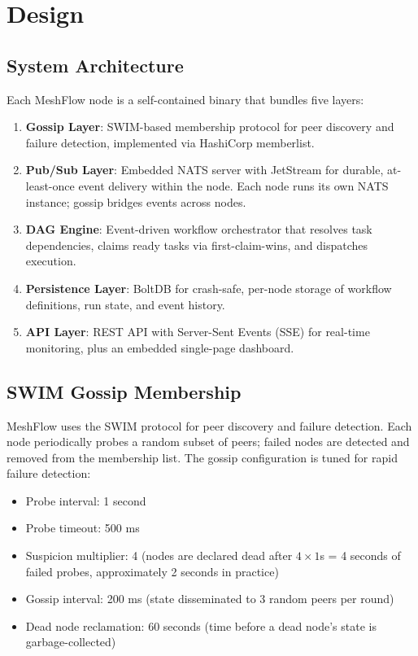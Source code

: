 \section{Design}

\subsection{System Architecture}

Each MeshFlow node is a self-contained binary that bundles five layers:

\begin{enumerate}
\item \textbf{Gossip Layer}: SWIM-based membership protocol for peer discovery and failure detection, implemented via HashiCorp memberlist.
\item \textbf{Pub/Sub Layer}: Embedded NATS server with JetStream for durable, at-least-once event delivery within the node. Each node runs its own NATS instance; gossip bridges events across nodes.
\item \textbf{DAG Engine}: Event-driven workflow orchestrator that resolves task dependencies, claims ready tasks via first-claim-wins, and dispatches execution.
\item \textbf{Persistence Layer}: BoltDB for crash-safe, per-node storage of workflow definitions, run state, and event history.
\item \textbf{API Layer}: REST API with Server-Sent Events (SSE) for real-time monitoring, plus an embedded single-page dashboard.
\end{enumerate}

\subsection{SWIM Gossip Membership}

MeshFlow uses the SWIM protocol for peer discovery and failure detection. Each node periodically probes a random subset of peers; failed nodes are detected and removed from the membership list. The gossip configuration is tuned for rapid failure detection:

\begin{itemize}
\item Probe interval: 1 second
\item Probe timeout: 500 ms
\item Suspicion multiplier: 4 (nodes are declared dead after $4 \times 1$s = 4 seconds of failed probes, approximately 2 seconds in practice)
\item Gossip interval: 200 ms (state disseminated to 3 random peers per round)
\item Dead node reclamation: 60 seconds (time before a dead node's state is garbage-collected)
\end{itemize}

